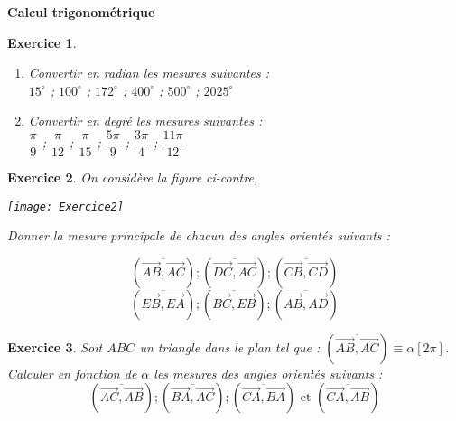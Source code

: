 \documentclass[12pt,a4paper]{article}
\theoremstyle{mystyle}
\newtheorem{exo}{Exercice}
\begin{document}
\pagestyle{fancy}
\fancyhf{} %
\fancyfoot[C]{\thepage} %


\begin{center}
    \textbf{\Large Calcul trigonométrique }
\end{center}
\begin{multicols*}{2}

\begin{exo}
\text{ }
\begin{enumerate}
    \item Convertir en radian les mesures suivantes : \\\(15^\circ\) ; \(100^\circ\) ; \(172^\circ\) ; \(400^\circ\) ; \(500^\circ\) ; \(2025^\circ\)
    
    \item Convertir en degré les mesures suivantes : \\\(\dfrac{\pi}{9}\) ; \(\dfrac{\pi}{12}\) ; \(\dfrac{\pi}{15}\) ; \(\dfrac{5\pi}{9}\) ; \(\dfrac{3\pi}{4}\) ; \(\dfrac{11\pi}{12}\)
\end{enumerate}
\end{exo}

\begin{exo}
On considère la figure ci-contre,
\begin{center}
	\texttt{[image: Exercice2]}
\end{center}
Donner la mesure principale de chacun des angles orientés suivants :

\[
\left( \overline{\overrightarrow{AB}, \overrightarrow{AC}} \right) ; \left( \overline{\overrightarrow{DC}, \overrightarrow{AC}} \right) ; \left( \overline{\overrightarrow{CB}, \overrightarrow{CD}} \right)
\]
\[
\left( \overline{\overrightarrow{EB}, \overrightarrow{EA}} \right) ; \left( \overline{\overrightarrow{BC}, \overrightarrow{EB}} \right) ; \left( \overline{\overrightarrow{AB}, \overrightarrow{AD}} \right)
\]
\end{exo}

\begin{exo}
Soit \( ABC \) un triangle dans le plan tel que : \( \left( \overline{\overrightarrow{AB}, \overrightarrow{AC}} \right) \equiv \alpha [2\pi] \). Calculer en fonction de \( \alpha \) les mesures des angles orientés suivants :
\[
\left( \overline{\overrightarrow{AC}, \overrightarrow{AB}} \right) ; \left( \overline{\overrightarrow{BA}, \overrightarrow{AC}} \right) ; \left( \overline{\overrightarrow{CA}, \overrightarrow{BA}} \right) \text{ et } \left( \overline{\overrightarrow{CA}, \overrightarrow{AB}} \right)
\]
\end{exo}


\end{multicols*}
\end{document}
